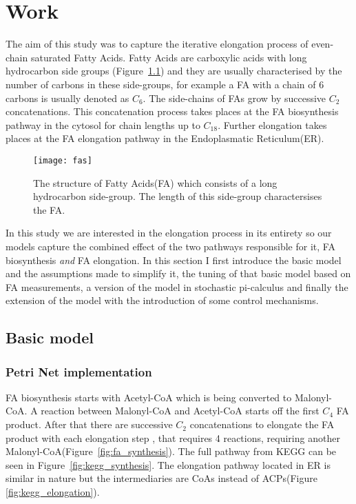 
\chapter{Work}
\label{chap:work}
\ifpdf
    \graphicspath{{Chapter3/Figs/Raster/}{Chapter3/Figs/PDF/}{Chapter3/Figs/}}
\else
    \graphicspath{{Chapter3/Figs/Vector/}{Chapter3/Figs/}}
\fi

The aim of this study was to capture the iterative elongation process
of even-chain saturated Fatty Acids. Fatty Acids are 
carboxylic acids with long hydrocarbon side groups
(Figure~\ref{fig:fas}) and they are usually characterised by the
number of carbons in these side-groups, for example a FA with a chain
of 6 carbons is usually denoted as $C_6$. The side-chains of FAs grow
by successive $C_2$ concatenations. This concatenation process takes places at
the FA biosynthesis pathway in the cytosol for chain lengths up to
$C_{18}$. Further elongation takes places at the FA elongation
pathway in the Endoplasmatic Reticulum(ER).

\begin{figure}[htbp!]
\centering
\texttt{[image: fas]}
\caption[Fatty Acid structure]{The structure of Fatty Acids(FA) which
  consists of a long hydrocarbon side-group. The length of this
  side-group charactersises the FA.}
\label{fig:fas}
\end{figure}

In this study we are interested in the elongation process in its
entirety so our models capture the combined effect of the two pathways
responsible for it, FA biosynthesis \textit{and} FA elongation. In
this section I first introduce the basic model and the assumptions
made to simplify it, the tuning of that basic model based on FA
measurements, a version of the model in stochastic pi-calculus and
finally the extension of the model with the introduction of some
control mechanisms.

\section{Basic model}
\subsection{Petri Net implementation}
FA biosynthesis starts with Acetyl-CoA which is being converted to
Malonyl-CoA. A reaction between Malonyl-CoA and Acetyl-CoA starts off
the first $C_4$ FA product. After that there are successive $C_2$
concatenations to elongate the FA product with each elongation step
, that requires 4 reactions, requiring another Malonyl-CoA(Figure~\ref{fig:fa_synthesis}). The
full pathway from KEGG can be seen in
Figure~\ref{fig:kegg_synthesis}. The elongation pathway located in ER
is similar in nature but the intermediaries are CoAs instead of
ACPs(Figure \ref{fig:kegg_elongation}). 

